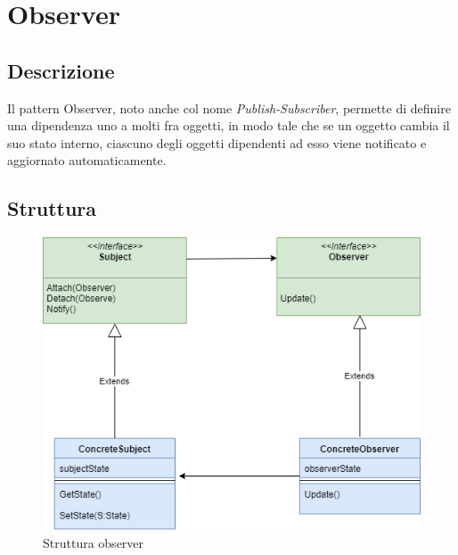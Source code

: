 \section{Observer}
\subsection{Descrizione}
Il pattern Observer, noto anche col nome \textit{Publish-Subscriber}, permette di definire una dipendenza uno a molti fra oggetti, in modo tale che se un oggetto cambia il suo stato interno, ciascuno degli oggetti dipendenti ad esso viene notificato e aggiornato automaticamente.

\subsection{Struttura}
\begin{figure}[H]
\centering
\includegraphics[scale=0.6]{images/observer}
\caption{Struttura observer\label{fig:UC3}}
\end{figure}

